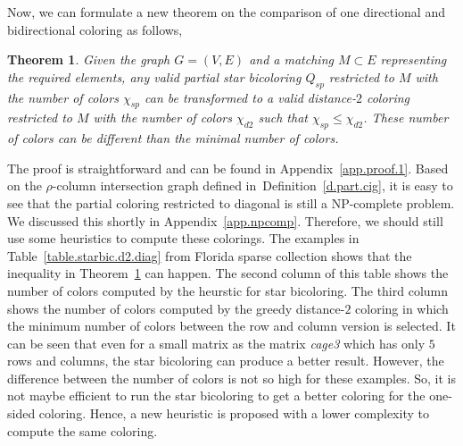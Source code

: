 \documentclass[11pt, twoside,a4paper]{book}
\newtheorem{theorem}{Theorem}
\newcommand{\defref}[1]{Definition~\protect\ref{#1}}
\newcommand{\appref}[1]{Appendix~\protect\ref{#1}}
\newcommand{\sparsifysymbol}{\ensuremath{\rho}}
\begin{document}
Now, we can formulate a new theorem on the comparison of one directional and
bidirectional coloring as follows,
\begin{theorem}
\label{t.matching}
Given the graph $G=(V,E)$ and a matching $M\subset E$ representing
the required elements, any valid partial star bicoloring $Q_{sp}$ restricted to $M$
with the number of colors $\chi_{sp}$
can be transformed to a valid distance-$2$ coloring restricted to $M$
with the number of colors $\chi_{d2}$ such that $\chi_{sp} \leq \chi_{d2}$.
These number of colors can be different than the minimal number of colors.
\end{theorem}
The proof is straightforward and can be found in \appref{app.proof.1}.
Based on the $\sparsifysymbol$-column intersection graph defined in~\defref{d.part.cig},
it is easy to see
that the partial coloring restricted to diagonal is still a NP-complete problem.
We discussed this shortly in \appref{app.npcomp}.
Therefore, we should still use some heuristics to compute these colorings.
The examples in Table~\ref{table.starbic.d2.diag} from Florida sparse collection shows that the
inequality in Theorem~\ref{t.matching} can happen. The second column of this table
shows the number of colors computed by the heurstic for star bicoloring.
The third column shows the number of colors computed by the greedy distance-$2$ coloring
in which the minimum number of colors between the row and column version is selected.
It can be seen that even for a small matrix as the matrix \textit{cage3} which has only
$5$ rows and columns, the star bicoloring can produce a better result.
However, the difference between the number of colors is not so high for these examples.
So, it is not maybe efficient to run the star bicoloring to get a better coloring for
the one-sided coloring. Hence, a new heuristic is proposed with a lower complexity
to compute the same coloring.
\end{document}

